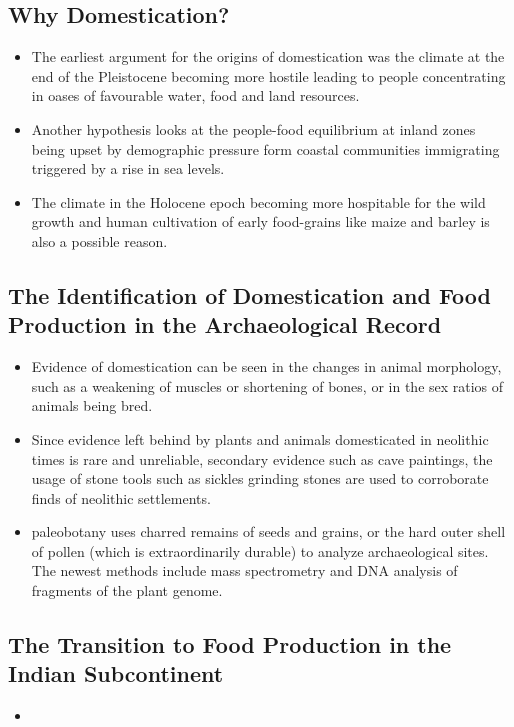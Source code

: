 \subsection{Why Domestication?}
\begin{itemize}
    \item The earliest argument for the origins of domestication was the climate at the end of the Pleistocene becoming more hostile leading to people concentrating in oases of favourable water, food and land resources.
    \item Another hypothesis looks at the people-food equilibrium at inland zones being upset by demographic pressure form coastal communities immigrating triggered by a rise in sea levels.
    \item The climate in the Holocene epoch becoming more hospitable for the wild growth and human cultivation of early food-grains like maize and barley is also a possible reason.
\end{itemize}

\subsection{The Identification of Domestication and Food Production in the Archaeological Record}
\begin{itemize}
    \item Evidence of domestication can be seen in the changes in animal \gls{morphology}, such as a weakening of muscles or shortening of bones, or in the sex ratios of animals being bred.
    \item Since evidence left behind by plants and animals domesticated in neolithic times is rare and unreliable, secondary evidence such as cave paintings, the usage of stone tools such as sickles grinding stones are used to corroborate finds of neolithic settlements.
    \item \Gls{paleobotany} uses charred remains of seeds and grains, or the hard outer shell of pollen (which is extraordinarily durable) to analyze archaeological sites. The newest methods include mass spectrometry and DNA analysis of fragments of the plant genome.
\end{itemize}

\subsection{The Transition to Food Production in the Indian Subcontinent}
\begin{itemize}
    \item 
\end{itemize}

